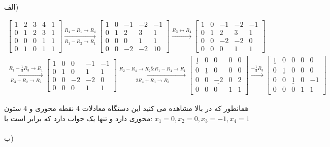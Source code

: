 \documentclass{article}
\begin{document}
\clearpage


\\
الف) 

\begin{gather*}	
\begin{bmatrix}
1&2&3&4&1\\	
0&1&2&3&1\\
0&0&0&1&1\\
0&1&0&1&1
\end{bmatrix}\xrightarrow[R_1-R_2\to R_1]{R_4-R_1\to R_4}
\begin{bmatrix}
1&0&-1&-2&-1\\
0&1&2&3&1\\
0&0&0&1&1\\
0&0&-2&-2&10
\end{bmatrix}\xrightarrow{R_3\leftrightarrow R_4}
\begin{bmatrix}
1&0&-1&-2&-1\\
0&1&2&3&1\\
0&0&-2&-2&0\\
0&0&0&1&1
\end{bmatrix}\\
\xrightarrow[R_3+R_2\to R_2]{R_1-\frac{1}{2}R_3\to R_1}
 \begin{bmatrix}
 1&0&0&-1&-1\\
 0&1&0&1&1\\
 0&0&-2&-2&0\\
 0&0&0&1&1
 \end{bmatrix}\xrightarrow[2R_4+R_3\to R_3]{R_2-R_4\to R_2\& R_1-R_4\to R_1}
\begin{bmatrix}
\underline{1}&0&0&0&0\\
0&\underline{1}&0&0&0\\
0&0&\underline{-2}&0&2\\
0&0&0&\underline{1}&1
\end{bmatrix}\xrightarrow{-\frac{1}{2}R_3}
\begin{bmatrix}
\underline{1}&0&0&0&0\\
0&\underline{1}&0&0&0\\
0&0&\underline{1}&0&-1\\
0&0&0&\underline{1}&1
\end{bmatrix}
\end{gather*}


همانطور که در بالا مشاهده می کنید این دستگاه معادلات 4 نقطه محوری و 4 ستون محوری دارد و تنها یک جواب دارد که برابر است با:
$x_1=0,x_2=0,x_3=-1,x_4=1$\\
\\
ب)
\end{document}
